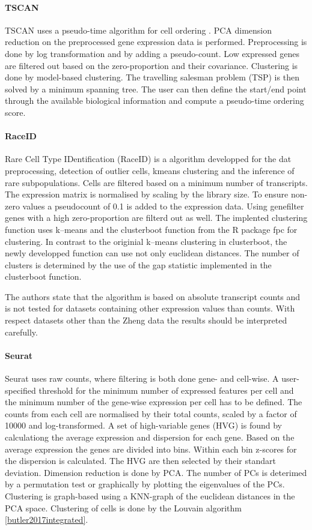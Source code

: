 \documentclass[12pt, a4paper]{article}\usepackage[]{graphicx}\usepackage[]{color}
\begin{document}
\paragraph{TSCAN}
TSCAN uses a pseudo-time algorithm for cell ordering \citep{ji2015tscan}. PCA dimension reduction on the preprocessed gene expression data is performed. Preprocessing is done by log transformation and by adding a pseudo-count. Low expressed genes are filtered out based on the zero-proportion and their covariance. Clustering is done by model-based clustering. 
The travelling salesman problem (TSP) is then solved by a minimum spanning tree. The user can then define the start/end point through the available biological information and compute a pseudo-time ordering score. 
\paragraph{RaceID}
Rare Cell Type IDentification (RaceID) is a algorithm developped for the dat preprocessing, detection of outlier cells, kmeans clustering and the inference of rare subpopulations. Cells are filtered based on a minimum number of transcripts. The expression matrix is normalised by scaling by the library size. To ensure non-zero values a pseudocount of 0.1 is added to the expression data.
Using genefilter genes with a high zero-proportion are filterd out as well.
The implented clustering function uses k--means and the clusterboot function from the R package fpc for clustering. In contrast to the originial k--means clustering in clusterboot, the newly developped function can use not only euclidean distances. 
The number of clusters is determined by the use of the gap statistic implemented in the clusterboot function.

The authors state that the algorithm is based on absolute transcript counts and is not tested for datasets containing other expression values than counts. With respect datasets other than the Zheng data the results should be interpreted carefully.

\paragraph{Seurat}
Seurat uses raw counts, where filtering is both done gene- and cell-wise. A user-specified threshold for the minimum number of expressed features per cell and the minimum number of the  gene-wise expression per cell has to be defined. The counts from each cell are normalised by their total counts, scaled by a factor of 10000 and log-transformed. A set of high-variable genes (HVG) is found by calculationg the average expression and dispersion for each gene. Based on the average expression the genes are divided into bins. Within each bin z-scores for the dispersion is calculated. The HVG are then selected by their standart deviation.
Dimension reduction is done by PCA. The number of PCs is deterimed by a permutation test or graphically by plotting the eigenvalues of the PCs. Clustering is graph-based using a KNN-graph of the euclidean distances in the PCA space. Clustering of cells is done by the Louvain algorithm \ref{butler2017integrated}.
\end{document}
